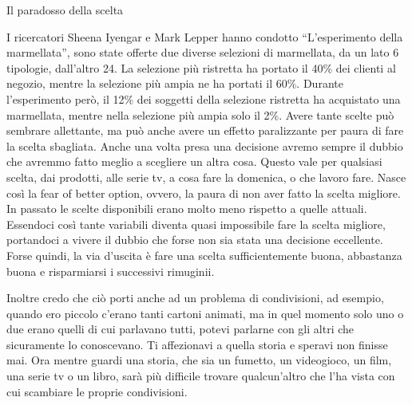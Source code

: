 \documentclass[12pt]{book} %
\begin{document}
\bigskip
\begin{mdframed}[linewidth=1pt]
Il paradosso della scelta

I ricercatori Sheena Iyengar e Mark Lepper hanno condotto “L'esperimento della marmellata”, sono
state offerte due diverse selezioni di marmellata, da un lato 6 tipologie, dall'altro 24. La
selezione più ristretta ha portato il 40\% dei clienti al negozio, mentre la selezione più ampia ne ha portati il 60\%.
Durante l'esperimento però, il 12\% dei soggetti della selezione ristretta ha acquistato una
marmellata, mentre nella selezione più ampia solo il 2\%. Avere tante scelte può sembrare allettante, ma può anche
avere un effetto paralizzante per paura di fare la scelta sbagliata. Anche una volta presa una decisione avremo sempre
il dubbio che avremmo fatto meglio a scegliere un altra cosa. Questo vale per qualsiasi scelta, dai prodotti, alle
serie tv, a cosa fare la domenica, o che lavoro fare. Nasce così la fear of better option, ovvero, la paura di non aver
fatto la scelta migliore. In passato le scelte disponibili erano molto meno rispetto a quelle attuali. Essendoci così
tante variabili diventa quasi impossibile fare la scelta migliore, portandoci a vivere il dubbio che forse non sia
stata una decisione eccellente. Forse quindi, la via d'uscita è fare una scelta sufficientemente
buona, abbastanza buona e risparmiarsi i successivi rimuginii.

Inoltre credo che ciò porti anche ad un problema di condivisioni, ad esempio, quando ero piccolo c'erano tanti cartoni animati, ma in quel momento solo uno o due erano quelli di cui parlavano tutti, potevi parlarne con gli altri che sicuramente lo conoscevano. Ti affezionavi a quella storia e speravi non finisse mai. Ora mentre guardi una storia, che sia un fumetto, un videogioco, un film, una serie tv o un libro, sarà più difficile trovare qualcun'altro che l'ha vista con cui scambiare le proprie condivisioni.
\end{mdframed}
\end{document}
